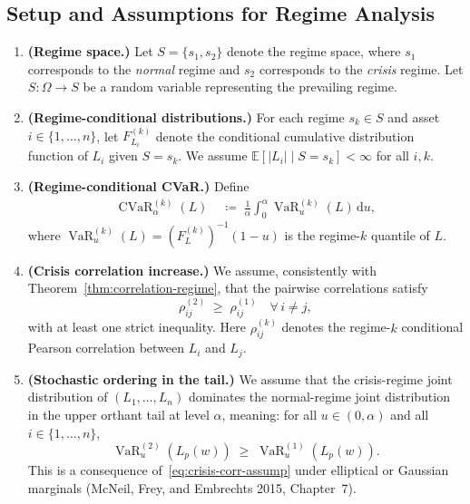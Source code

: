 \documentclass[12pt,openany]{book}
\newcommand{\bfw}{\mathbf{w}}
\DeclareMathOperator{\CVaR}{CVaR}
\DeclareMathOperator{\VaR}{VaR}
\numberwithin{equation}{chapter}
\theoremstyle{plain}
\theoremstyle{definition}
\theoremstyle{remark}
\def\mathcal#1{#1}%
\def\bfw{w}%
\begin{document}
\subsection{Setup and Assumptions for Regime Analysis}

\begin{enumerate}[label=\textbf{B\arabic*.}, leftmargin=*, widest=B5]

  \item \textbf{(Regime space.)}
        Let $\mathcal{S} = \{s_1, s_2\}$ denote the regime space,
        where $s_1$ corresponds to the \emph{normal} regime and
        $s_2$ corresponds to the \emph{crisis} regime.  Let
        $S : \Omega \to \mathcal{S}$ be a random variable
        representing the prevailing regime.

  \item \textbf{(Regime-conditional distributions.)}
        For each regime $s_k \in \mathcal{S}$ and asset
        $i \in \{1,\ldots,n\}$, let $F_{L_i}^{(k)}$ denote the
        conditional cumulative distribution function of $L_i$
        given $S = s_k$.  We assume $\mathbb{E}[|L_i| \mid S=s_k]
        < \infty$ for all $i,k$.

  \item \textbf{(Regime-conditional CVaR.)}
        Define
        \begin{align}
          \CVaR_\alpha^{(k)}(L)
          &\;\coloneqq\;
          \frac{1}{\alpha}
          \int_0^\alpha \VaR_u^{(k)}(L)\,\mathrm{d}u,
          \label{eq:cvar-regime-def}
        \end{align}
        where $\VaR_u^{(k)}(L) = (F_{L}^{(k)})^{-1}(1-u)$ is the
        regime-$k$ quantile of $L$.

  \item \textbf{(Crisis correlation increase.)}
        We assume, consistently with Theorem~\ref{thm:correlation-regime},
        that the pairwise correlations satisfy
        \begin{equation}
          \rho_{ij}^{(2)} \;\geq\; \rho_{ij}^{(1)}
          \quad \forall\, i \neq j,
          \label{eq:crisis-corr-assump}
        \end{equation}
        with at least one strict inequality.  Here
        $\rho_{ij}^{(k)}$ denotes the regime-$k$ conditional
        Pearson correlation between $L_i$ and $L_j$.

  \item \textbf{(Stochastic ordering in the tail.)}
        We assume that the crisis-regime joint distribution of
        $(L_1,\ldots,L_n)$ dominates the normal-regime joint
        distribution in the upper orthant tail at level $\alpha$,
        meaning: for all $u \in (0,\alpha)$ and all
        $i \in \{1,\ldots,n\}$,
        \begin{equation}
          \VaR_u^{(2)}(L_p(\bfw))
          \;\geq\; \VaR_u^{(1)}(L_p(\bfw)).
          \label{eq:tail-ordering-assump}
        \end{equation}
        This is a consequence of~\eqref{eq:crisis-corr-assump}
        under elliptical or Gaussian marginals (McNeil, Frey,
        and Embrechts 2015, Chapter~7).

\end{enumerate}
\end{document}
